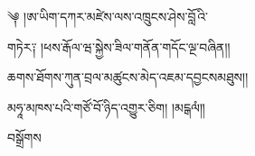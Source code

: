 \documentclass{article}
\begin{document}
\bgroup
\LARGE\tibetan
\noindent༆ །ཨ་ཡིག་དཀར་མཛེས་ལས་འཁྲུངས་ཤེས་བློ  འི་\par
གཏེར༑ །ཕས་རྒོལ་ཝ་སྐྱེས་ཟིལ་གནོན་གདོང་ལྔ་བཞིན།།\par
ཆགས་ཐོགས་ཀུན་བྲལ་མཚུངས་མེད་འཇམ་དབྱངསམཐུས།།\par
མཧཱ་མཁས་པའི་གཙོ་བོ་ཉིད་འགྱུར་ཅིག། །མངྒལཾ༎\par
བསྒྲོགས
\egroup
\end{document}
